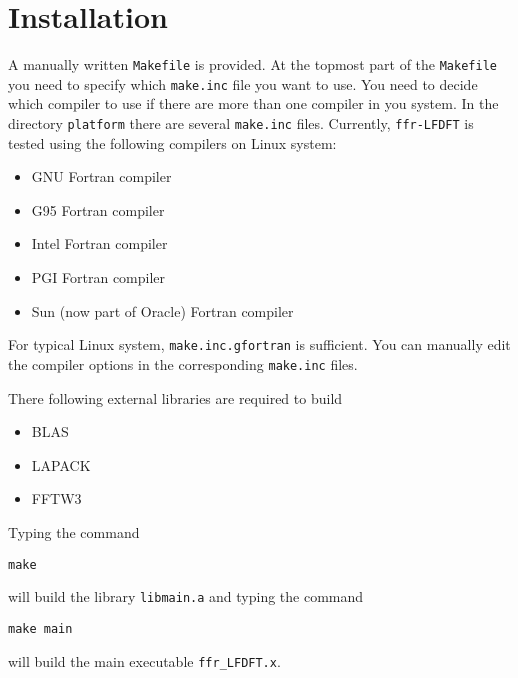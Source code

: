 \section{Installation}

A manually written {\tt Makefile} is provided. At the topmost part of the
{\tt Makefile} you need to specify which {\tt make.inc} file you
want to use. You need to decide which compiler to use if there
are more than one compiler in you system.
In the directory {\tt platform} there are several {\tt make.inc} files.
Currently, {\tt ffr-LFDFT} is tested using the following compilers
on Linux system:
\begin{itemize}
\item GNU Fortran compiler
\item G95 Fortran compiler
\item Intel Fortran compiler
\item PGI Fortran compiler
\item Sun (now part of Oracle) Fortran compiler
\end{itemize}
For typical Linux system, {\tt make.inc.gfortran} is sufficient.
You can manually edit the compiler options in the corresponding {\tt make.inc}
files.

There following external libraries are required to build \ffrLFDFT
\begin{itemize}
\item BLAS
\item LAPACK
\item FFTW3
\end{itemize}

Typing the command
\begin{verbatim}
make
\end{verbatim}
will build the library {\tt libmain.a} and typing
the command
\begin{verbatim}
make main
\end{verbatim}
will build the main executable {\tt ffr\_LFDFT.x}.


